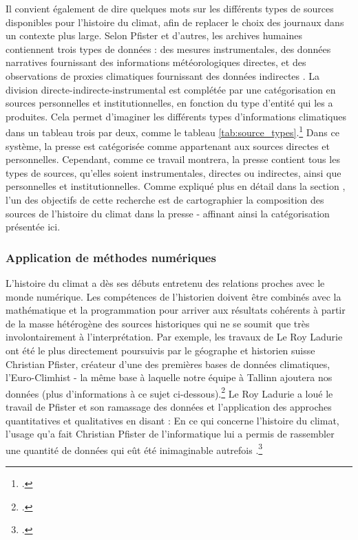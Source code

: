 \documentclass[a4paper,twoside,12pt]{article}
\begin{document}
Il convient également de dire quelques mots sur les différents types de sources disponibles pour l'histoire du climat, afin de replacer le choix des journaux dans un contexte plus large. Selon Pfister et d'autres, \og les archives humaines contiennent trois types de données : des mesures instrumentales, des données narratives fournissant des informations météorologiques directes, et des observations de proxies climatiques fournissant des données indirectes \fg{}. La division directe-indirecte-instrumental est complétée par une catégorisation en sources \og personnelles \fg{} et \og institutionnelles\fg{}, en fonction du type d'entité qui les a produites. Cela permet d'imaginer les différents types d'informations climatiques dans un tableau trois par deux, comme le tableau \ref{tab:source_types}.\footcite[Adapté de :][38]{white_palgrave_2018} Dans ce système, la presse est catégorisée comme appartenant aux sources directes et personnelles. Cependant, comme ce travail montrera, la presse contient tous les types de sources, qu'elles soient instrumentales, directes ou indirectes, ainsi que personnelles et institutionnelles. Comme expliqué plus en détail dans la section \og {} \fg{}, l'un des objectifs de cette recherche est de cartographier la composition des sources de l'histoire du climat dans la presse - affinant ainsi la catégorisation présentée ici.



\subsubsection*{Application de méthodes numériques}

L'histoire du climat a dès ses débuts entretenu des relations proches avec le monde numérique. Les compétences de l'historien doivent être combinés avec la mathématique et la programmation pour arriver aux résultats cohérents à partir de la masse hétérogène des sources historiques qui ne se soumit que très involontairement à l'interprétation. Par exemple, les travaux de Le Roy Ladurie ont été le plus directement poursuivis par le géographe et historien suisse Christian Pfister, créateur d'une des premières bases de données climatiques, l'Euro-Climhist - la même base à laquelle notre équipe à Tallinn ajoutera nos données (plus d'informations à ce sujet ci-dessous).\footcite[][]{pfister_euro-climhist_2015} Le Roy Ladurie a loué le travail de Pfister et son ramassage des données et l'application des approches quantitatives et qualitatives en disant : \og En ce qui concerne l’histoire du climat, l’usage qu’a fait Christian Pfister de l’informatique lui a permis de rassembler une quantité de données qui eût été inimaginable autrefois \fg{}.\footcite[168]{le_roy_ladurie_vie_2014}
\end{document}
